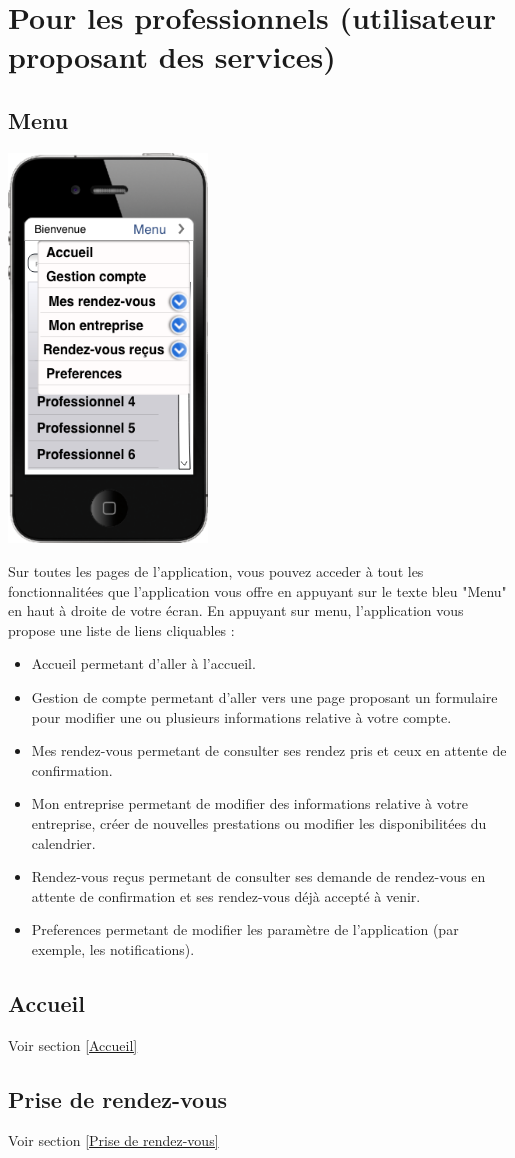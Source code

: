 \documentclass{article}
\begin{document}
\section{Pour les professionnels (utilisateur proposant des services)}
\subsection{Menu}
\begin{center}
  \includegraphics[width=150pt]{Interfaces/menupro}

\end{center}
Sur toutes les pages de l'application, vous pouvez acceder à tout les fonctionnalitées que l'application vous offre en appuyant sur le texte bleu "Menu" en haut à droite de votre écran. En appuyant sur menu, l'application vous propose une liste de liens cliquables :
\begin{itemize}
  \item Accueil permetant d'aller à l'accueil.
  \item Gestion de compte permetant d'aller vers une page proposant un formulaire pour modifier une ou plusieurs informations relative à votre compte.
  \item Mes rendez-vous permetant de consulter ses rendez pris et ceux en attente de confirmation.
  \item Mon entreprise permetant de modifier des informations relative à votre entreprise, créer de nouvelles prestations ou modifier les disponibilitées du calendrier.
  \item Rendez-vous reçus permetant de consulter ses demande de rendez-vous en attente de confirmation et ses rendez-vous déjà accepté à venir.
  \item Preferences permetant de modifier les paramètre de l'application (par exemple, les notifications).
\end{itemize}

\subsection{Accueil}
 Voir section \ref{Accueil}
\subsection{Prise de rendez-vous}
 Voir section \ref{Prise de rendez-vous}
\end{document}
